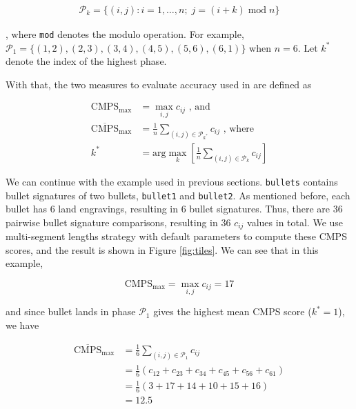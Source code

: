 \begin{align}
\mathcal{P}_k = \{ \left(i,j\right): i = 1, \dots, n ; \; j = \left(i + k\right) \;\mathrm{mod}\; n \}
\end{align}

, where \texttt{mod} denotes the modulo operation. For example,
\(\mathcal{P}_1 = \{ \left(1,2\right), \left(2,3\right), \left(3,4\right), \left(4,5\right), \left(5,6\right), \left(6,1\right) \}\)
when \(n = 6\). Let \(k^*\) denote the index of the highest phase.

With that, the two measures to evaluate accuracy used in \citet{cmps}
are defined as

\begin{align}
\mathrm{CMPS_{max}} &= \max_{i,j} c_{ij} \text{ , and} \\
\mathrm{\overline{CMPS}_{max}} &= \frac{1}{n} \sum_{(i,j) \in \mathcal{P}_{k^*}} c_{ij} \text{ , where} \\
k^* &= \text{arg}\max\limits_{k} \left[  \frac{1}{n} \sum_{(i,j) \in \mathcal{P}_k} c_{ij}\right]
\end{align}

We can continue with the example used in previous sections.
\texttt{bullets} contains bullet signatures of two bullets,
\texttt{bullet1} and \texttt{bullet2}. As mentioned before, each bullet
has 6 land engravings, resulting in 6 bullet signatures. Thus, there are
36 pairwise bullet signature comparisons, resulting in 36 \(c_{ij}\)
values in total. We use multi-segment lengths strategy with default
parameters to compute these CMPS scores, and the result is shown in
Figure \ref{fig:tiles}. We can see that in this example,

\[
\mathrm{CMPS_{max}} =  \max_{i,j} c_{ij} = 17
\]

and since bullet lands in phase \(\mathcal{P}_1\) gives the highest mean
CMPS score (\(k^* = 1\)), we have

\[
\begin{aligned}
\mathrm{\overline{CMPS}_{max}} &= \frac{1}{6} \sum_{(i,j) \in \mathcal{P}_1} c_{ij} \\
                        &= \frac{1}{6} \left(c_{12} + c_{23} + c_{34} + c_{45} + c_{56} + c_{61}\right) \\
                        &= \frac{1}{6} \left(3+17+14+10+15+16\right) \\
                        &= 12.5
\end{aligned}
\]

